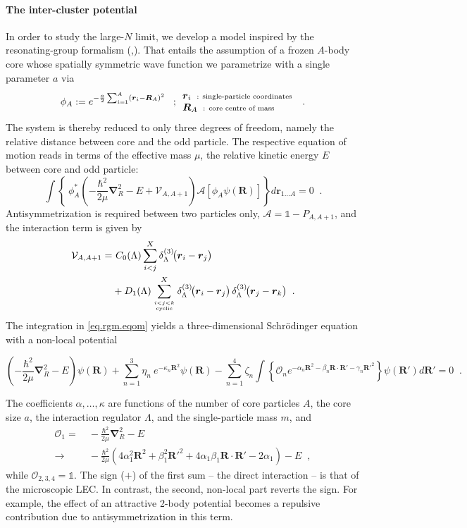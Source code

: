 \documentclass[aps,nofootinbib,prl,showpacs,twocolumn,groupedaddress,superscriptaddress]
{revtex4}
\newcommand{\la}{\label}
\newcommand{\be}{\begin{equation}}
\newcommand{\ee}{\end{equation}}
\newcommand{\ve}[1]{\ensuremath{\boldsymbol{#1}}}
\newcommand{\ddrei}[1]{\delta_{\tiny \Lambda}^{(3)}\!\big(#1\big)}
\begin{document}
\paragraph{The inter-cluster potential}
In order to study the large-$N$ limit, we develop a model inspired by the resonating-group formalism
(\cite{Wheeler:1937zz},\cite{Wildermuth1977}).
That entails the assumption of a frozen $A$-body core whose spatially symmetric wave function we
parametrize with a single parameter $a$ via
\be\label{eq.rgm.corewfkt}
\phi_A:=e^{-\frac{a}{2}\sum_{i=1}^A\left(\ve{r}_i-\ve{R}_A\right)^2}\;\;\;;
\begin{array}{l}
     \ve{r}_i\;\;\text{\scriptsize : single-particle coordinates}  \\
     \ve{R}_A\;\;\text{\scriptsize : core centre of mass}
\end{array}\;\;.
\ee
The system is thereby reduced to only three degrees of freedom, namely the relative distance
between core and the odd particle. The respective equation of motion reads in terms of the effective
mass $\mu$, the relative kinetic energy $E$ between core and odd particle:
\be\label{eq.rgm.eqom}
\int\left\lbrace~\phi^*_A\left(-\frac{\hbar^2}{2\mu}\ve{\nabla}_R^2-E+\mathcal{V}_{A,A+1}\right)
\mathcal{A}\left[\phi_A\psi(\ve{R})\right]\right\rbrace d\ve{r}_{1\ldots A}=0\;\;.
\ee
Antisymmetrization is required between two particles only, $\mathcal{A}=\mathbb{1}-P_{A,A+1}$, and the
interaction term is given by
\begin{align}
\mathcal{V}_{A,A+1}=&~C_0(\Lambda)\sum_{i<j}^X\ddrei{\ve{r}_i-\ve{r}_j}\\
&+D_1(\Lambda)\sum^X_{i<j<k\atop\text{\tiny cyclic}}\ddrei{\ve{r}_i-\ve{r}_j}\,
\ddrei{\ve{r}_j-\ve{r}_k}\;\;.\nonumber
\end{align}
The integration in \eqref{eq.rgm.eqom} yields a three-dimensional Schr\"odinger equation with a
non-local potential
\begin{widetext}
\be\label{eq.rgm.sglnonloc}
\left(-\frac{\hbar^2}{2\mu}\ve{\nabla}_R^2-E\right)\psi(\ve{R})+\sum_{n=1}^3\eta_n~e^{-\kappa_n\ve{R}^2}\psi(\ve{R})-
\sum_{n=1}^4\zeta_n\int\left\lbrace\mathcal{O}_ne^{-\alpha_n\ve{R}^2-\beta_n\ve{R}\cdot\ve{R}'-\gamma_n\ve{R}'^2}\right\rbrace\psi(\ve{R}') d\ve{R}'=0\;\;.
\ee
\end{widetext}
The coefficients $\alpha,\ldots,\kappa$ are functions of the number of
core particles $A$,
the core size $a$, the interaction regulator $\Lambda$,
and the single-particle mass $m$, and 
\begin{align}\la{eq.exop}
\mathcal{O}_1=&~-\frac{\hbar^2}{2\mu}\ve{\nabla}_R^2-E\\
\to&~-\frac{\hbar^2}{2\mu}\left(4\alpha_1^2\ve{R}^2+\beta_1^2\ve{R}'^2
+4\alpha_1\beta_1\ve{R}\cdot\ve{R}'-2\alpha_1\right)-E\;\;,\nonumber
\end{align}
while $\mathcal{O}_{2,3,4}=\mathbb{1}$. The sign ($+$) of the first sum -- the direct
interaction -- is that of the microscopic LEC. In contrast, the second, non-local
part reverts the sign. For example, the effect of an attractive 2-body potential
becomes a repulsive contribution due to antisymmetrization in this term.
\end{document}
